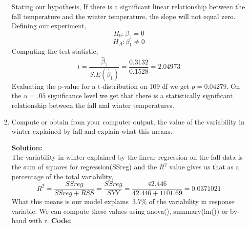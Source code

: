 \documentclass[12pt]{article}
\makeatletter
\theoremstyle{homework}
\newenvironment{exercise}[1]
{\def\@currentlabel{#1}\exercisecore}
{\endexercisecore}
\newcommand{\localhead}[1]{\par\smallskip\noindent\textbf{#1}\nobreak\\}%
\newcommand\solution{\localhead{Solution:}}
\makeatother
\begin{document}
\begin{exercise}{1}
\begin{enumerate}
    Stating our hypothesis, If there is a significant linear relationship between 
    the fall temperature and the winter temperature, 
    the slope will not equal zero. Defining our experiment, 
    \begin{equation*}
      H_0: \beta_1 = 0
    \end{equation*}
    \begin{equation*}
      H_A: \beta_1 \neq 0
    \end{equation*}
    Computing the test statistic, 
    \begin{equation*}
      t = \dfrac{\hat{\beta}_1}{S.E(\hat{\beta}_1)} = \dfrac{0.3132}{0.1528} = 2.04973
    \end{equation*}
    Evaluating the p-value for a t-distribution on 109 df we get $p = 0.04279$. On the $\alpha = .05$
    significance level we get that there is a statistically significant relationship between 
    the fall and winter temperatures. 
    \newpage

    \item Compute or obtain from your computer output, the value of the variability 
    in winter explained by fall and explain what this means. \\
    \solution The variability in winter explained by the linear regression on 
    the fall data is the sum of squares for regression(SSreg) and the $R^2$ value gives us 
    that as a percentage of the total variability,
    \begin{equation*}
      R^2 = \dfrac{SSreg}{SSreg+RSS}  =  \dfrac{SSreg}{SYY} = \dfrac{42.446}{42.446 + 1101.69} = 0.0371021
    \end{equation*}
    What this means is our model explains $~3.7\%$ of the variability in response variable. 
    We can compute these values using anova(), summary(lm()) or by-hand with r. 
    \textbf{Code:}
        \begin{center}
        
        \end{center} 
  \end{enumerate}
\end{exercise}
\newpage
\end{document}
